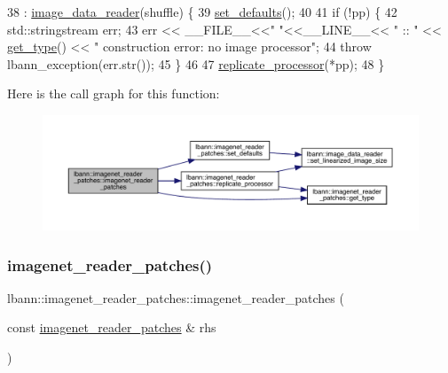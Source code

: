 \begin{DoxyCode}
38   : \hyperlink{classlbann_1_1image__data__reader_a582185ab03c4643117fd93e0ba843882}{image\_data\_reader}(shuffle) \{
39   \hyperlink{classlbann_1_1imagenet__reader__patches_a3458e4274b9ed894973a069cf884f04a}{set\_defaults}();
40 
41   \textcolor{keywordflow}{if} (!pp) \{
42     std::stringstream err;
43     err << \_\_FILE\_\_<<\textcolor{stringliteral}{" "}<<\_\_LINE\_\_<< \textcolor{stringliteral}{" :: "} << \hyperlink{classlbann_1_1imagenet__reader__patches_adc6363b20f058260c674d92af2a6ef80}{get\_type}() << \textcolor{stringliteral}{" construction error: no image
       processor"};
44     \textcolor{keywordflow}{throw} lbann\_exception(err.str());
45   \}
46 
47   \hyperlink{classlbann_1_1imagenet__reader__patches_a714247cc547161688a66a64737527de0}{replicate\_processor}(*pp);
48 \}
\end{DoxyCode}
Here is the call graph for this function\+:\nopagebreak
\begin{figure}[H]
\begin{center}
\leavevmode
\includegraphics[width=350pt]{classlbann_1_1imagenet__reader__patches_a03a784a9beaf615e9bae9b54763e951b_cgraph}
\end{center}
\end{figure}
\mbox{\label{classlbann_1_1imagenet__reader__patches_aca10e740934921c5c0399aae6e873a88}} 
\subsubsection{\texorpdfstring{imagenet\+\_\+reader\+\_\+patches()}{imagenet\_reader\_patches()}\hspace{0.1cm}{\footnotesize\ttfamily [3/3]}}
{\footnotesize\ttfamily lbann\+::imagenet\+\_\+reader\+\_\+patches\+::imagenet\+\_\+reader\+\_\+patches (\begin{DoxyParamCaption}\item[{const \hyperlink{classlbann_1_1imagenet__reader__patches}{imagenet\+\_\+reader\+\_\+patches} \&}]{rhs }\end{DoxyParamCaption})}



